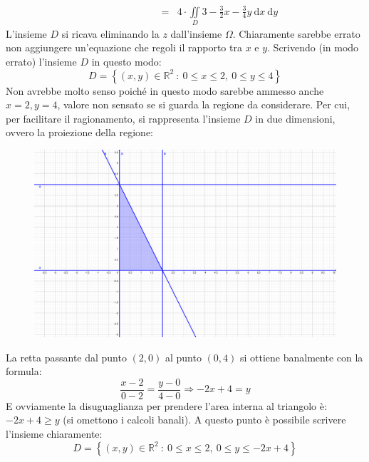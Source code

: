 \documentclass[a4paper]{article}
\begin{document}
	\begin{equation*}
		\begin{array}{rcl}
			\phantom{\displaystyle\iiint\limits_{\Omega} 4 \:\mathrm{d}x\:\mathrm{d}y\:\mathrm{d}z}
			&=&
			4\cdot\displaystyle\iint\limits_{D} 3 - \frac{3}{2}x - \frac{3}{4}y \:\mathrm{d}x\:\mathrm{d}y
		\end{array}
	\end{equation*}
	L'insieme $D$ si ricava eliminando la $z$ dall'insieme $\Omega$. Chiaramente sarebbe errato non aggiungere un'equazione che regoli il rapporto tra $x$ e $y$. Scrivendo (in modo errato) l'insieme $D$ in questo modo:
	\begin{equation*}
		D = \left\{\left(x,y\right) \in \mathbb{R}^{2} \: : \: 0 \le x \le 2,\: 0 \le y \le 4\right\}
	\end{equation*}
	Non avrebbe molto senso poiché in questo modo sarebbe ammesso anche $x=2,y=4$, valore non sensato se si guarda la regione da considerare. Per cui, per facilitare il ragionamento, si rappresenta l'insieme $D$ in due dimensioni, ovvero la proiezione della regione:
	\begin{figure}[!htp]
		\centering
		\includegraphics[width=.5\textwidth]{img/exercise/2023-06-21-A-ex7_2.pdf}
	\end{figure}

	\noindent
	La retta passante dal punto $\left(2,0\right)$ al punto $\left(0,4\right)$ si ottiene banalmente con la formula:
	\begin{equation*}
		\dfrac{x-2}{0-2} = \dfrac{y-0}{4-0} \Rightarrow -2x + 4 = y
	\end{equation*}
	E ovviamente la disuguaglianza per prendere l'area interna al triangolo è: $-2x + 4 \ge y$ (si omettono i calcoli banali). A questo punto è possibile scrivere l'insieme chiaramente:
	\begin{equation*}
		D = \left\{\left(x,y\right) \in \mathbb{R}^{2} \: : \: 0 \le x \le 2,\: 0 \le y \le -2x + 4\right\}
	\end{equation*}\newpage
\end{document}
